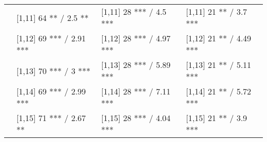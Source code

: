 \begin{table}
\begin{tabular}[t]{llll}
 & {}[1,11] 64 ** / 2.5 ** & {}[1,11] 28 *** / 4.5 *** & {}[1,11] 21 ** / 3.7 ***\\
 & {}[1,12] 69 *** / 2.91 *** & {}[1,12] 28 *** / 4.97 *** & {}[1,12] 21 ** / 4.49 ***\\
\addlinespace
 & {}[1,13] 70 *** / 3 *** & {}[1,13] 28 *** / 5.89 *** & {}[1,13] 21 ** / 5.11 ***\\
 & {}[1,14] 69 *** / 2.99 *** & {}[1,14] 28 *** / 7.11 *** & {}[1,14] 21 ** / 5.72 ***\\
 & {}[1,15] 71 *** / 2.67 ** & {}[1,15] 28 *** / 4.04 *** & {}[1,15] 21 ** / 3.9 ***\\
\bottomrule
\end{tabular}
\end{table}
